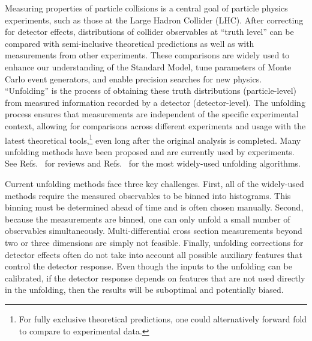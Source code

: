 \documentclass[prl,twocolumn,superscriptaddress,longbibliography,preprintnumbers,nofootinbib]{revtex4-1}
\DeclareRobustCommand{\Refs}[1]{Refs.~\cite{#1}}
\begin{document}
%
Measuring properties of particle collisions is a central goal of particle physics experiments, such as those at the Large Hadron Collider (LHC).
%
After correcting for detector effects, distributions of collider observables at ``truth level'' can be compared with semi-inclusive theoretical predictions as well as with measurements from other experiments.
%
These comparisons are widely used to enhance our understanding of the Standard Model, tune parameters of Monte Carlo event generators, and enable precision searches for new physics.
%
``Unfolding'' is the process of obtaining these truth distributions ({particle-level}) from measured information recorded by a detector ({detector-level}).
%
The unfolding process ensures that measurements are independent of the specific experimental context, allowing for comparisons across different experiments and usage with the latest theoretical tools,\footnote{For fully exclusive theoretical predictions, one could alternatively forward fold to compare to experimental data.} even long after the original analysis is completed.
%
Many unfolding methods have been proposed and are currently used by experiments.
%
See \Refs{Cowan:2002in,Blobel:2203257,doi:10.1002/9783527653416.ch6,Balasubramanian:2019itp} for reviews and \Refs{DAgostini:1994fjx,Hocker:1995kb,Schmitt:2012kp} for the most widely-used unfolding algorithms.


%
Current unfolding methods face three key challenges.
%
First, all of the widely-used methods require the measured observables to be binned into histograms.
%
This binning must be determined ahead of time and is often chosen manually.
%
Second, because the measurements are binned, one can only unfold a small number of observables simultaneously.
%
Multi-differential cross section measurements beyond two or three dimensions are simply not feasible.
%
Finally, unfolding corrections for detector effects often do not take into account all possible auxiliary features that control the detector response.
%
Even though the inputs to the unfolding can be calibrated, if the detector response depends on features that are not used directly in the unfolding, then the results will be suboptimal and potentially biased.
\end{document}
